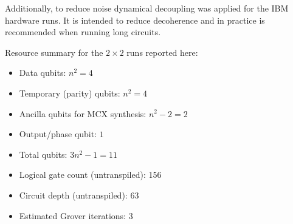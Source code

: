 \vspace{1em}
\noindent Additionally, to reduce noise dynamical decoupling\cite{IBMQuantumDocumentationDynamicalDecoupling} was applied for the IBM hardware runs. It is intended to reduce decoherence and in practice is recommended when running long circuits.

\vspace{1em}
\noindent Resource summary for the $2\times 2$ runs reported here:
\begin{itemize}
	\item Data qubits: $n^2 = 4$
	\item Temporary (parity) qubits: $n^2 = 4$
	\item Ancilla qubits for MCX synthesis: $n^2 - 2 = 2$
	\item Output/phase qubit: $1$
	\item Total qubits: $3n^2 - 1 = 11$
	\item Logical gate count (untranspiled): 156
	\item Circuit depth (untranspiled): 63
	\item Estimated Grover iterations: 3
\end{itemize}
